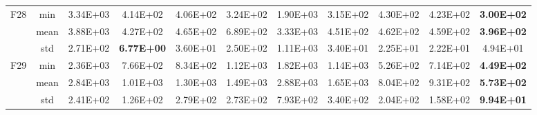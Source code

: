 \documentclass[preprint,review,compress,12pt]{elsarticle}
\begin{document}
\begin{table}[H]
{\begin{tabular}{ccccccccccc}
    \multirow{3}[0]{*}{F28} & min   & 3.34E+03 & 4.14E+02 & 4.06E+02 & 3.24E+02 & 1.90E+03 & 3.15E+02 & 4.30E+02 & 4.23E+02 & \textbf{3.00E+02} \\
          & mean  & 3.88E+03 & 4.27E+02 & 4.65E+02 & 6.89E+02 & 3.33E+03 & 4.51E+02 & 4.62E+02 & 4.59E+02 & \textbf{3.96E+02} \\
          & std   & 2.71E+02 & \textbf{6.77E+00} & 3.60E+01 & 2.50E+02 & 1.11E+03 & 3.40E+01 & 2.25E+01 & 2.22E+01 & 4.94E+01 \\
    \multirow{3}[0]{*}{F29} & min   & 2.36E+03 & 7.66E+02 & 8.34E+02 & 1.12E+03 & 1.82E+03 & 1.14E+03 & 5.26E+02 & 7.14E+02 & \textbf{4.49E+02} \\
          & mean  & 2.84E+03 & 1.01E+03 & 1.30E+03 & 1.49E+03 & 2.88E+03 & 1.65E+03 & 8.04E+02 & 9.31E+02 & \textbf{5.73E+02} \\
          & std   & 2.41E+02 & 1.26E+02 & 2.79E+02 & 2.73E+02 & 7.93E+02 & 3.40E+02 & 2.04E+02 & 1.58E+02 & \textbf{9.94E+01} \\
    \bottomrule
    \end{tabular}%
    }
  \label{tab:addlabel}%
\end{table}%

\begin{table}[H]
\renewcommand{\thetable}{3}
  \centering
  \caption{Result of CEC2017 \ \ (Continued.2)}
  \label{tab:addlabel}%
\end{table}%
\end{document}
